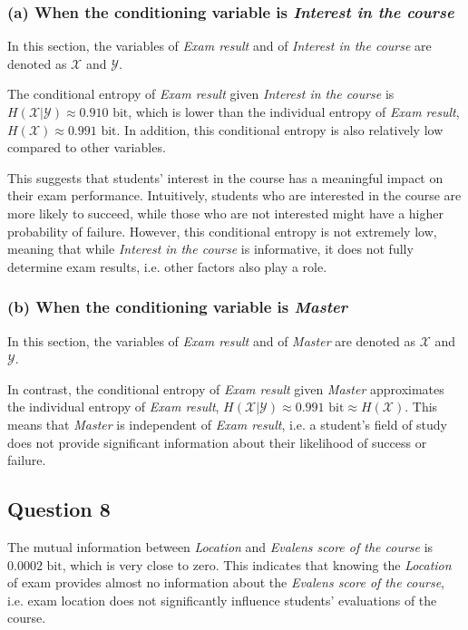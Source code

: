 \documentclass{article}
\begin{document}
\subsubsection*{(a) When the conditioning variable is \textit{Interest in the course}}
In this section, the variables of \textit{Exam result} and of \textit{Interest in the course} are denoted as $\mathcal{X}$ and $\mathcal{Y}$.

The conditional entropy of \textit{Exam result} given \textit{Interest in the course} is $H(\mathcal{X} | \mathcal{Y}) \approx 0.910 \mbox{ bit}$, which is lower than the individual entropy of \textit{Exam result}, $H(\mathcal{X}) \approx 0.991 \mbox{ bit}$. In addition, this conditional entropy is also relatively low compared to other variables.

This suggests that students' interest in the course has a meaningful impact on their exam performance. Intuitively, students who are interested in the course are more likely to succeed, while those who are not interested might have a higher probability of failure. However, this conditional entropy is not extremely low, meaning that while \textit{Interest in the course} is informative, it does not fully determine exam results, i.e. other factors also play a role.

\subsubsection*{(b) When the conditioning variable is \textit{Master}}

In this section, the variables of \textit{Exam result} and of \textit{Master} are denoted as $\mathcal{X}$ and $\mathcal{Y}$.

In contrast, the conditional entropy of \textit{Exam result} given \textit{Master} approximates the individual entropy of \textit{Exam result}, $H(\mathcal{X} | \mathcal{Y}) \approx 0.991 \mbox{ bit} \approx H(\mathcal{X})$. This means that \textit{Master} is independent of \textit{Exam result}, i.e. a student's field of study does not provide significant information about their likelihood of success or failure.

\subsection*{Question 8}

The mutual information between \textit{Location} and \textit{Evalens score of the course} is $0.0002 \mbox{ bit}$, which is very close to zero. This indicates that knowing the \textit{Location} of exam provides almost no information about the \textit{Evalens score of the course}, i.e. exam location does not significantly influence students' evaluations of the course.
\end{document}
